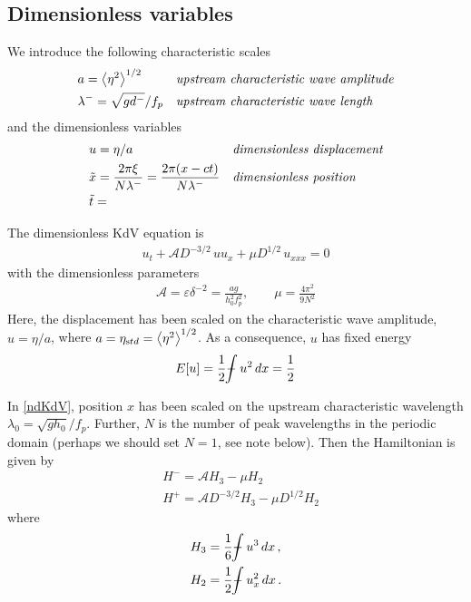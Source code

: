\documentclass[11pt]{article}
\newcommand{\vsp}[1]{\vspace{#1 pc} \noindent}
\newcommand{\mean}[1]{\left< #1 \right>}
\newcommand{\eps}{\varepsilon}
\newcommand{\depth}{d}
\newcommand{\dup}{\depth^{-}}
\newcommand{\lamup}{\lambda^{-}}
\newcommand{\freqp}{f_p}
\newcommand{\etastd}{\eta_{\text std}}
\newcommand{\ampp}{\mathcal{A}}
\newcommand{\lamfac}{N}
\newcommand{\Hp}{H^{+}}
\newcommand{\Hm}{H^{-}}
\def\Xint#1{\mathchoice
   {\XXint\displaystyle\textstyle{#1}}%
   {\XXint\textstyle\scriptstyle{#1}}%
   {\XXint\scriptstyle\scriptscriptstyle{#1}}%
   {\XXint\scriptscriptstyle\scriptscriptstyle{#1}}%
   \!\int}
\def\XXint#1#2#3{{\setbox0=\hbox{$#1{#2#3}{\int}$}
     \vcenter{\hbox{$#2#3$}}\kern-.5\wd0}}
\def\dashint{\Xint-}
\newcommand{\intt}{\dashint}%
\newcommand{\dx}{\, dx}
\begin{document}
\subsection{Dimensionless variables}

We introduce the following characteristic scales
\begin{align}
&a = \mean{\eta^2}^{1/2} 
&&\mbox{\em upstream characteristic wave amplitude} \\
&\lamup = \sqrt{g \dup} / \freqp
&&\mbox{\em upstream characteristic wave length}
\end{align}
and the dimensionless variables
\begin{align}
&u = \eta/a
&&\mbox{\em dimensionless displacement} \\
&\tilde{x} = \frac{2 \pi \xi}{\lamfac \lamup} = \frac{2 \pi (x-ct)}{\lamfac \lamup}
&&\mbox{\em dimensionless position} \\
& \tilde{t} = 
\end{align}

\vsp{10}
The dimensionless KdV equation is
\begin{align}
\label{varKdV}
u_t + \ampp D^{-3/2} \, u u_x + \mu D^{1/2} \, u_{xxx} = 0
\end{align}
with the dimensionless parameters
\begin{align}
\label{ndKdV}
\ampp = \eps \delta^{-2} = \frac{ag}{h_0^2 f_p^2} , \qquad
\mu = \frac{4 \pi^2}{9 \lamfac^2}
\end{align}
Here, the displacement has been scaled on the characteristic wave amplitude, $u = \eta/a$, where $a = \etastd= \mean{\eta^2}^{1/2}$.
As a consequence, $u$ has fixed energy
\begin{equation}
E[u] = \frac{1}{2} \intt u^2 \dx = \frac{1}{2}
\end{equation}

In \eqref{ndKdV}, position $x$ has been scaled on the upstream characteristic wavelength $\lambda_0 = \sqrt{g h_0}/f_p$. Further, $\lamfac$ is the number of peak wavelengths in the periodic domain (perhaps we should set $\lamfac=1$, see note below).
Then the Hamiltonian is given by
\begin{align}
\label{Hamiltonian}
& \Hm = \ampp H_3 - \mu H_2 \\
& \Hp = \ampp D^{-3/2} H_3 - \mu D^{1/2} H_2
\end{align}
where
\begin{align}
&H_3 = \frac{1}{6} \intt u^3 \dx	\, , \\
&H_2 = \frac{1}{2} \intt u_x^2 \dx	\, .
\end{align}
\end{document}

